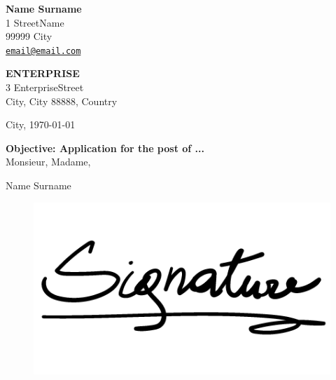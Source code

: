 \documentclass[12pt]{article}
\makeatletter
\newcommand\authorcl{Name Surname}
\newcommand\datation{City, \today}
\newcommand\objet{Application for the post of ...}
\newcommand\mondirection{1 StreetName}
\newcommand\codepostaletville{99999 City}
\newcommand\email{\href{mailto:email@email.com}{\texttt{email@email.com}}}
\newcommand\entreprisedestinataire{\textbf{ENTERPRISE}}
\newcommand\directionentreprise{3 EnterpriseStreet}
\newcommand\entreprisevillecodepostalpays{City, City 88888, Country}
\makeatother
\begin{document}
\pagestyle{empty}

\textbf{\authorcl}\\
\mondirection\\
\codepostaletville\\
\email\\

\begin{flushright}
\entreprisedestinataire\\
\directionentreprise\\
\entreprisevillecodepostalpays\\
\end{flushright}

\datation\\
\par\bigskip\textbf{Objective: \objet}\\




Monsieur, Madame, 



\lipsum[1-2]




\bigskip
\begin{flushright}
	\authorcl\\
\end{flushright}


\begin{figure}[h]
  \raggedleft
  \includegraphics[scale=0.2]{signature/signature-template.png}
\end{figure}
\end{document}
